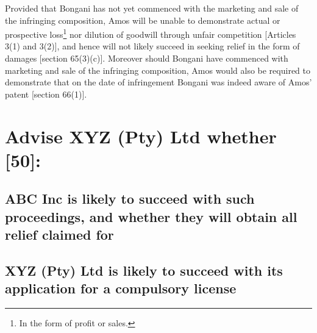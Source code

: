 \documentclass[11pt]{article}
\begin{document}
Provided that Bongani has not yet commenced with the marketing and sale of the
infringing composition, Amos will be unable to demonstrate actual or prospective loss\footnote{In the form of profit or sales.} nor
dilution of goodwill through unfair competition [Articles 3(1) and
3(2)]\cite{wipo96_model_provi_unfair_comp}, and hence will not likely
succeed in seeking relief in the form of damages [section
65(3)(c)]\cite{rsa78_patents_act}. Moreover should Bongani have commenced with
marketing and sale of the infringing composition, Amos would also be required to demonstrate
that on the date of infringement Bongani was indeed aware of Amos' patent
[section 66(1)]\cite{rsa78_patents_act}.
\section{Advise XYZ (Pty) Ltd whether [50]:}
\label{sec:org875a8af}
\subsection{ABC Inc is likely to succeed with such proceedings, and whether they will obtain all relief claimed for}
\label{sec:org9397084}
\subsection{XYZ (Pty) Ltd is likely to succeed with its application for a compulsory license}
\label{sec:org19574e6}
\printbibliography
\end{document}

